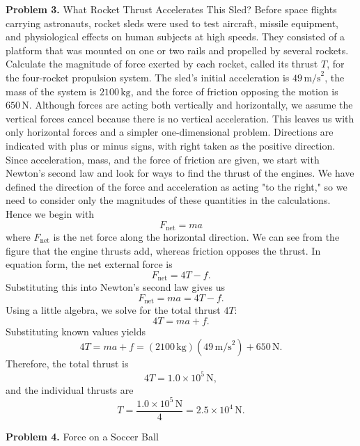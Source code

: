 \documentclass{report}
\begin{document}
    \pagebreak \bigbreak \noindent 
    \textbf{Problem 3.} What Rocket Thrust Accelerates This Sled?
    \bigbreak \noindent 
    Before space flights carrying astronauts, rocket sleds were used to test aircraft, missile equipment, and physiological effects on human subjects at high speeds. They consisted of a platform that was mounted on one or two rails and propelled by several rockets.
    \bigbreak \noindent 
    Calculate the magnitude of force exerted by each rocket, called its thrust $T$, for the four-rocket propulsion system. The sled's initial acceleration is $49\, \text{m/s}^2$, the mass of the system is $2100\, \text{kg}$, and the force of friction opposing the motion is $650\, \text{N}$.
    \bigbreak \noindent 
    \bigbreak \noindent 
    Although forces are acting both vertically and horizontally, we assume the vertical forces cancel because there is no vertical acceleration. This leaves us with only horizontal forces and a simpler one-dimensional problem. Directions are indicated with plus or minus signs, with right taken as the positive direction. 
    \bigbreak \noindent 
    Since acceleration, mass, and the force of friction are given, we start with Newton's second law and look for ways to find the thrust of the engines. We have defined the direction of the force and acceleration as acting "to the right," so we need to consider only the magnitudes of these quantities in the calculations. Hence we begin with
    \[
        F_{\text{net}} = ma
    \]
    where $F_{\text{net}}$ is the net force along the horizontal direction. We can see from the figure that the engine thrusts add, whereas friction opposes the thrust. In equation form, the net external force is
    \[
        F_{\text{net}} = 4T - f.
    \]
    Substituting this into Newton's second law gives us
    \[
        F_{\text{net}} = ma = 4T - f.
    \]
    Using a little algebra, we solve for the total thrust $4T$:
    \[
        4T = ma + f.
    \]
    Substituting known values yields
    \[
        4T = ma + f = (2100\,\text{kg})(49\,\text{m/s}^2) + 650\,\text{N}.
    \]
    Therefore, the total thrust is
    \[
        4T = 1.0 \times 10^5\,\text{N},
    \]
    and the individual thrusts are
    \[
        T = \frac{1.0 \times 10^5\,\text{N}}{4} = 2.5 \times 10^4\,\text{N}.
    \]

    \bigbreak \noindent 
    \textbf{Problem 4.} Force on a Soccer Ball






    
\end{document}
